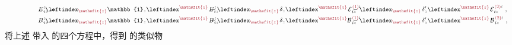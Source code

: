 \begin{subequations} \label{eq:EB-01}
\begin{align}
	\hphantom{xxxxxxxxx} E^{\;\!\mathcolor{gray}{t}}_{\;\! i\mathcolor{gray}{z}} &= &&\hspace{-2.5em}\leftindex_{\textcolor{Maroon}{\mathsfit{z}}} {\mathbb{1}}_{\mathcolor{gray}{z}} \leftindex^{\textcolor{Maroon}{\mathsfit{z}}} \;\! E^{\;\!\mathcolor{gray}{t}}_{\;\! i\mathcolor{gray}{z}} &&\hspace{-2.5em}- \leftindex_{\textcolor{Maroon}{\mathsfit{z}}} \;\! \delta_{\mathcolor{gray}{z}} \leftindex^{\textcolor{Maroon}{\mathsfit{z}}} \;\!
	{\mathcal{E}}^{\;\!\textcolor{Maroon}{(1)}\mathcolor{gray}{t}}_{\;\! i\mathcolor{gray}{z}} &&\hspace{-2.5em}- \leftindex_{\textcolor{Maroon}{\mathsfit{z}}} \;\! \delta'_{\mathcolor{gray}{z}} \leftindex^{\textcolor{Maroon}{\mathsfit{z}}} \;\! {\mathcal{E}}^{\;\!\textcolor{Maroon}{(2)}\mathcolor{gray}{t}}_{\;\! i\mathcolor{gray}{z}} ~,&& \label{eq:E-01} \\
	\hphantom{xxxxxxxxx} B^{\;\!\mathcolor{gray}{t}}_{\;\! i\mathcolor{gray}{z}} &= &&\hspace{-2.5em}\leftindex_{\textcolor{Maroon}{\mathsfit{z}}} {\mathbb{1}}_{\mathcolor{gray}{z}} \leftindex^{\textcolor{Maroon}{\mathsfit{z}}} \;\! B^{\;\!\mathcolor{gray}{t}}_{\;\! i\mathcolor{gray}{z}} &&\hspace{-2.5em}- \leftindex_{\textcolor{Maroon}{\mathsfit{z}}} \;\! \delta_{\mathcolor{gray}{z}} \leftindex^{\textcolor{Maroon}{\mathsfit{z}}}
	{\mathcal{B}}^{\;\!\textcolor{Maroon}{(1)}\mathcolor{gray}{t}}_{\;\! i\mathcolor{gray}{z}} &&\hspace{-2.5em}- \leftindex_{\textcolor{Maroon}{\mathsfit{z}}} \;\! \delta'_{\mathcolor{gray}{z}} \leftindex^{\textcolor{Maroon}{\mathsfit{z}}} \;\! {\mathcal{B}}^{\;\!\textcolor{Maroon}{(2)}\mathcolor{gray}{t}}_{\;\! i\mathcolor{gray}{z}} ~,&& \label{eq:B-01}
\end{align}
\end{subequations}
将上述  带入  的四个方程中，得到  的类似物
